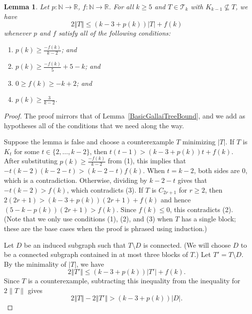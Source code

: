 \documentclass[12pt]{article}
\theoremstyle{plain}
\newtheorem{lem}[thm]{Lemma}
\theoremstyle{definition}
\theoremstyle{remark}
\newcommand{\fancy}[1]{\mathcal{#1}}
\newcommand{\IN}{\mathbb{N}}
\newcommand{\IR}{\mathbb{R}}
\newcommand{\T}{\fancy{T}}
\newcommand{\set}[1]{\left\{ #1 \right\}}
\newcommand{\card}[1]{\left|#1\right|}
\newcommand{\size}[1]{\left\Vert#1\right\Vert}
\newcommand{\func}[3]{#1\colon #2 \rightarrow #3}
\newcommand{\parens}[1]{\left( #1 \right)}
\begin{document}
\begin{lem}\label{BoundFamilyWithoutKKMinusOne}
	Let $\func{p}{\IN}{\IR}$, $\func{f}{\IN}{\IR}$.
	For all $k \ge 5$ and $T \in \T_k$ with $K_{k-1} \not \subseteq T$, we have
	\[2\size{T} \le (k-3 + p(k))\card{T} + f(k)\]
	whenever $p$ and $f$ satisfy all of the following conditions:
	\begin{enumerate}
		\item[(1)] $p(k) \ge \frac{-f(k)}{k-2}$; and
		\item[(2)] $p(k) \ge \frac{-f(k)}{5} + 5 - k$; and
		\item[(3)] $0\ge f(k)\ge -k+2$; and
		\item[(4)] $p(k) \ge \frac{3}{k-2}$.
	\end{enumerate}
\end{lem}
\begin{proof}
The proof mirrors that of
Lemma~\ref{BasicGallaiTreeBound}, and we add as hypotheses all of the conditions that
we need along the way.

Suppose the lemma is false and choose a counterexample $T$ minimizing $|T|$. 
If $T$ is $K_t$ for some $t \in \{2,\ldots,k-2\}$, then $t(t-1) > (k-3 + p(k))t +
f(k)$.  After substituting $p(k)\ge \frac{-f(k)}{k-2}$ from (1), this
implies that $-t(k-2)(k-2-t)>(k-2-t)f(k)$.  When $t=k-2$, both sides are 0,
which is a contradiction.  Otherwise, dividing by $k-2-t$ gives that
$-t(k-2)>f(k)$, which contradicts (3).  If $T$ is $C_{2r+1}$ for
$r \ge 2$, then $2(2r+1) > (k-3 + p(k))(2r+1) + f(k)$ and hence
$(5-k-p(k))(2r+1)>f(k)$.  Since $f(k)\le 0$, this contradicts (2).  (Note that
we only use conditions (1), (2), and (3) when $T$ has a single block;
these are the base cases when the proof is phrased using induction.)

Let $D$ be an %
induced subgraph such that $T\setminus D$ is connected.  (We will choose $D$ to
be a connected subgraph contained in at most three blocks of $T$.)
Let $T' = T \setminus D$. %
By the minimality of $|T|$, we have
	\[2\size{T'} \le (k-3 + p(k))\card{T'} + f(k).\]
	Since $T$ is a counterexample, subtracting this inequality from the inequality for
$2\|T\|$ gives
	\begin{equation}
	2\size{T} - 2\size{T'} > (k-3 + p(k))|D|. \tag{*}\label{eqn:*}
	\end{equation}
	

\end{proof}
\end{document}
